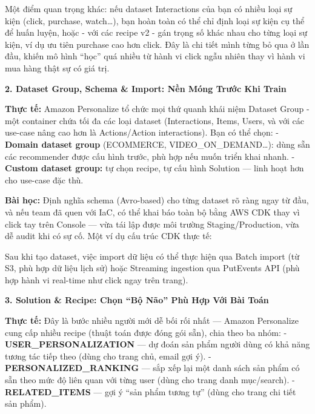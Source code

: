 Một điểm quan trọng khác: nếu dataset Interactions của bạn có nhiều loại
sự kiện (click, purchase, watch\ldots), bạn hoàn toàn có thể chỉ định
loại sự kiện cụ thể để huấn luyện, hoặc - với các recipe v2 - gán trọng
số khác nhau cho từng loại sự kiện, ví dụ ưu tiên purchase cao hơn
click. Đây là chi tiết mình từng bỏ qua ở lần đầu, khiến mô hình ``học''
quá nhiều từ hành vi click ngẫu nhiên thay vì hành vi mua hàng thật sự
có giá trị.

\vspace{0.5em}\noindent\textbf{2. Dataset Group, Schema \& Import: Nền Móng Trước Khi
Train}\par

\textbf{Thực tế:} Amazon Personalize tổ chức mọi thứ quanh khái niệm
Dataset Group - một container chứa tối đa các loại dataset
(Interactions, Items, Users, và với các use-case nâng cao hơn là
Actions/Action interactions). Bạn có thể chọn: - \textbf{Domain dataset
group} (ECOMMERCE, VIDEO\_ON\_DEMAND\ldots): dùng sẵn các recommender
được cấu hình trước, phù hợp nếu muốn triển khai nhanh. - \textbf{Custom
dataset group:} tự chọn recipe, tự cấu hình Solution --- linh hoạt hơn
cho use-case đặc thù.

\textbf{Bài học:} Định nghĩa schema (Avro-based) cho từng dataset rõ
ràng ngay từ đầu, và nếu team đã quen với IaC, có thể khai báo toàn bộ
bằng AWS CDK thay vì click tay trên Console --- vừa tái lập được môi
trường Staging/Production, vừa dễ audit khi có sự cố. Một ví dụ cấu trúc
CDK thực tế:

\begin{Shaded}
\begin{Highlighting}[]
\end{Highlighting}
\end{Shaded}

Sau khi tạo dataset, việc import dữ liệu có thể thực hiện qua Batch
import (từ S3, phù hợp dữ liệu lịch sử) hoặc Streaming ingestion qua
PutEvents API (phù hợp hành vi real-time như click ngay trên trang).

\vspace{0.5em}\noindent\textbf{3. Solution \& Recipe: Chọn ``Bộ Não'' Phù Hợp Với Bài
Toán}\par

\textbf{Thực tế:} Đây là bước nhiều người mới dễ bối rối nhất --- Amazon
Personalize cung cấp nhiều recipe (thuật toán được đóng gói sẵn), chia
theo ba nhóm: - \textbf{USER\_PERSONALIZATION} --- dự đoán sản phẩm
người dùng có khả năng tương tác tiếp theo (dùng cho trang chủ, email
gợi ý). - \textbf{PERSONALIZED\_RANKING} --- sắp xếp lại một danh sách
sản phẩm có sẵn theo mức độ liên quan với từng user (dùng cho trang danh
mục/search). - \textbf{RELATED\_ITEMS} --- gợi ý ``sản phẩm tương tự''
(dùng cho trang chi tiết sản phẩm).


